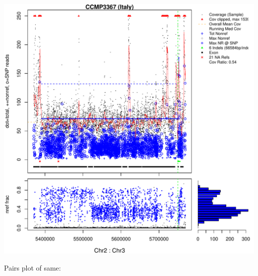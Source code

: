 \documentclass{article}\usepackage[]{graphicx}\usepackage[]{color}
\makeatletter
\def\maxwidth{ %
  \ifdim\Gin@nat@width>\linewidth
    \linewidth
  \else
    \Gin@nat@width
  \fi
}
\newenvironment{knitrout}{}{} %
\makeatother
\begin{document}
\begin{knitrout}
{\includegraphics[width=\maxwidth]{figs-knitr/unnamed-chunk-37-7} 

}



\end{knitrout}

Pairs plot of same:
 
\end{document}

